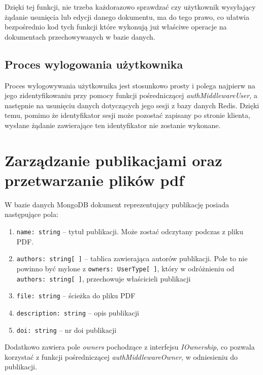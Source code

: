 \documentclass[a4paper,12pt,twoside,openany]{report}
\begin{document}
Dzięki tej funkcji, nie trzeba każdorazowo sprawdzać czy użytkownik wysyłający żądanie usunięcia lub edycji danego dokumentu, ma do tego prawo, co ułatwia bezpośrednio kod tych funkcji które wykonują już właściwe operacje na dokumentach przechowywanych w bazie danych.

\subsection{Proces wylogowania użytkownika}
Proces wylogowywania użytkownika jest stosunkowo prosty i polega najpierw na jego zidentyfikowaniu przy pomocy funkcji pośredniczącej \textit{authMiddlewareUser}, a następnie na usunięciu danych dotyczących jego sesji z bazy danych Redis. Dzięki temu, pomimo że identyfikator sesji może pozostać zapisany po stronie klienta, wysłane żądanie zawierające ten identyfikator nie zostanie wykonane.
\newpage
\section{Zarządzanie publikacjami oraz przetwarzanie plików pdf}
W bazie danych MongoDB dokument reprezentujący publikację posiada następujące pola: 
\begin{enumerate}
	
	\item \verb|name: string| -- tytuł publikacji. Może zostać odczytany podczas  z pliku PDF.
	
	\item \verb|authors: string[ ]| -- tablica zawierająca autorów publikacji. Pole to nie powinno być mylone z \verb|owners: UserType[ ]|, który w odróżnieniu od \verb|authors: string[ ]|, przechowuje właścicieli publikacji
	
	\item \verb|file: string| -- ścieżka do pliku PDF 
	
	\item \verb|description: string| -- opis publikacji
	
	\item \verb|doi: string| -- nr doi publikacji
\end{enumerate}
Dodatkowo zawiera pole \textit{owners} pochodzące z interfejsu \textit{IOwnership}, co pozwala korzystać z funkcji pośredniczącej \textit{authMiddlewareOwner}, w odniesieniu do publikacji.
\end{document}
